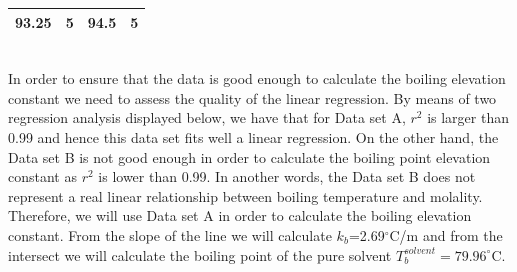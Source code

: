 \documentclass[main.tex]{subfiles}
\begin{document}
\begin{description}
\begin{example}
\begin{center}
\begin{tabular}[t]{  c c c c   }
 93.25	&5&	94.5	&5\\
\bottomrule
\end{tabular}\end{center}
 \\
 In order to ensure that the data is good enough to calculate the boiling elevation constant we need to assess the quality of the linear regression. By means of two regression analysis displayed below, we have that for Data set A, $r^2$ is larger than 0.99 and hence this data set fits well a linear regression. On the other hand, the Data set B is not good enough in order to calculate the boiling point elevation constant as  $r^2$ is lower than  0.99. In another words, the Data set B does not represent a real linear relationship between boiling temperature and molality. Therefore, we will use Data set A in order to calculate the boiling elevation constant. From the slope of the line we will calculate $k_b$=2.69$^{\circ}$C/m and from the intersect we will calculate the boiling point of the pure solvent $T^{solvent}_b=79.96^{\circ}$C.
 \tableLabel
{}
\end{example}
\end{description}
\end{document}

